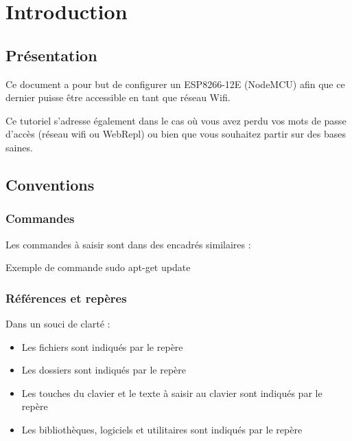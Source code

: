 \chapter{Introduction}     

\section{Présentation}

Ce document a pour but de configurer un ESP8266-12E (NodeMCU) afin que ce dernier puisse être accessible en tant que réseau Wifi.

Ce tutoriel s'adresse également dans le cas où vous avez perdu vos mots de passe d'accès (réseau wifi ou WebRepl) ou bien que vous souhaitez partir sur des bases saines.\\



\section{Conventions}


\subsection*{Commandes}

Les commandes à saisir sont dans des encadrés similaires : \\
\begin{Bash}{Exemple de commande}
sudo apt-get update
\end{Bash}

\subsection*{Références et repères}

Dans un souci de clarté : 

\begin{itemize}


	\item Les fichiers sont indiqués par le repère 
	\item Les dossiers sont indiqués par le repère 
	\item Les touches du clavier et le texte à saisir au clavier sont indiqués par le repère 
	\item Les bibliothèques, logiciels et utilitaires sont indiqués par le repère 

\end{itemize}


